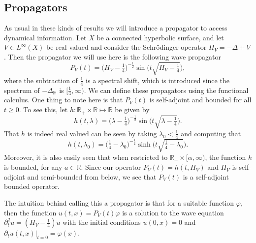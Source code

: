 \documentclass[11pt,twoside,reqno]{amsart}
\newcommand{\R}{\mathbb{R}}
\newcommand{\bH}{\mathbb{H}}
\newcommand{\1}{\mathrm{\mathbf{1}}}
\numberwithin{equation}{section}
\theoremstyle{plain}
\theoremstyle{definition}
\theoremstyle{remark}
\begin{document}
\subsection{Propagators}\label{SEC:propagators}
As usual in these kinds of results we will introduce a propagator to access dynamical information. Let $X$ be a connected hyperbolic surface, and let $V\in L^\infty(X)$ be real valued and consider the Schr\"odinger operator $H_V = -\Delta +V$.  Then the propagator we will use here is the following wave propagator
\begin{equation*}
    P_V(t) = \big(H_V-\tfrac{1}{4}\big)^{-\frac12}\sin\big(t\sqrt{H_V-\tfrac14}\big),
\end{equation*}
where the subtraction of $\frac14$ is a spectral shift, which is introduced since the spectrum of $-\Delta_\bH$ is $[\frac14,\infty)$. We can define these propagators using the functional calculus. One thing to note here is that $P_V(t)$ is self-adjoint and bounded for all $t\geq 0$. To see this, let $h: \R_+\times \R \mapsto \R$ be given by
\begin{equation}\label{EQ:def_h}
    h(t,\lambda) = \big(\lambda-\tfrac{1}{4}\big)^{-\frac12}\sin\big(t\sqrt{\lambda-\tfrac14}\big).
\end{equation}
That $h$ is indeed real valued can be seen by taking $\lambda_0<\frac14$ and computing that
\begin{equation*}
     h(t,\lambda_0) = \big(\tfrac{1}{4} - \lambda_0 \big)^{-\frac12}\sinh\big(t\sqrt{\tfrac14 - \lambda_0}\big).
\end{equation*}
Moreover, it is also easily seen that when restricted to $\R_+\times [\alpha,\infty)$, the function $h$ is bounded, for any $a \in \R$. Since our operator $P_V(t) = h(t,H_V)$ and $H_V$ is self-adjoint and semi-bounded from below, we see that $P_V(t)$ is a self-adjoint bounded operator.

The intuition behind calling this a propagator is that for a suitable function $\varphi$, then the function $u(t,x)=P_V(t) \varphi$ is a solution to the wave equation $\partial_t^2u = (H_V -\frac{1}{4}) u$ with the initial conditions $u(0,x) = 0$ and $\partial_t u(t,x)|_{t=0} = \varphi(x)$.
\end{document}
